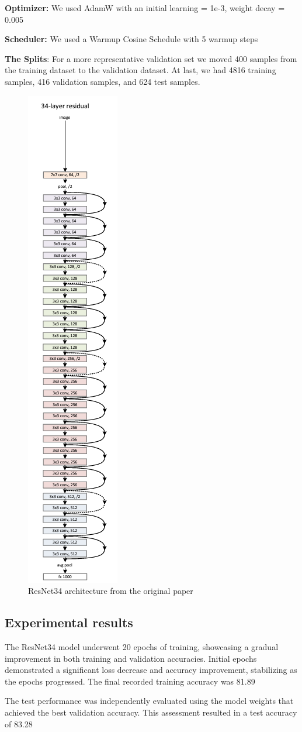 \documentclass{article}
\begin{document}
\textbf{Optimizer:} We used AdamW with an initial learning = 1e-3, weight decay = 0.005

\textbf{Scheduler:} We used a Warmup Cosine Schedule with 5 warmup steps

\textbf{The Splits}: For a more representative validation set we moved 400 samples from the training dataset to the validation dataset. At last, we had 4816 training samples, 416 validation samples, and 624 test samples.

\begin{figure}
  \centering
  \includegraphics[width=0.15\linewidth, angle=90]{resnet.png}
  \caption{ResNet34 architecture from the original paper}
  \label{fig:resnet}
\end{figure}

\subsection{Experimental results}
The ResNet34 model underwent 20 epochs of training, showcasing a gradual improvement in both training and validation accuracies. Initial epochs demonstrated a significant loss decrease and accuracy improvement, stabilizing as the epochs progressed. The final recorded training accuracy was 81.89%

The test performance was independently evaluated using the model weights that achieved the best validation accuracy. This assessment resulted in a test accuracy of 83.28%
\end{document}
